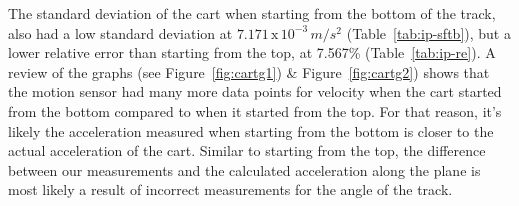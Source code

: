 The standard deviation of the cart when starting from the bottom of the track, also had a low standard deviation at $7.171\,\text{x}\,10^{-3}\,m/s^2$ (Table~\ref{tab:ip-sftb}), but a lower relative error than starting from the top, at 7.567\% (Table~\ref{tab:ip-re}). A review of the graphs (see Figure~\ref{fig:cartg1}) \& Figure~\ref{fig:cartg2}) shows that the motion sensor had many more data points for velocity when the cart started from the bottom compared to when it started from the top. For that reason, it's likely the acceleration measured when starting from the bottom is closer to the actual acceleration of the cart. Similar to starting from the top, the difference between our measurements and the calculated acceleration along the plane is most likely a result of incorrect measurements for the angle of the track. \par

